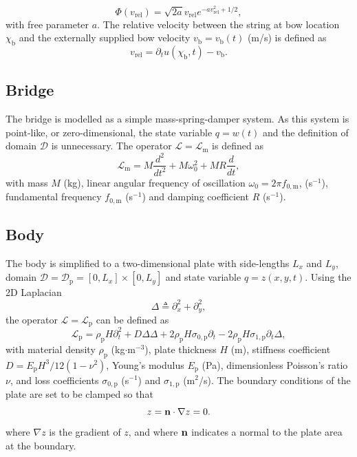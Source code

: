 \documentclass[dvipsnames, pdftex]{article}
\def\stringx{\chi}
\def\us{u}
\def\up{z}
\begin{document}
\begin{equation}
    \Phi(v_\text{rel}) = \sqrt{2a}v_\text{rel}e^{-av_\text{rel}^2+1/2},
\end{equation}
with free parameter $a$. The relative velocity between the string at bow location $\stringx_\text{b}$ and the externally supplied bow velocity $v_\text{b} = v_\text{b}(t)$ (m/s) is defined as
\begin{equation}
    v_\text{rel} = \partial_t\us(\stringx_\text{b},t) - v_\text{b}.
\end{equation}

\subsection{Bridge}
The bridge is modelled as a simple mass-spring-damper system. As this system is point-like, or zero-dimensional, 
the state variable $q = w(t)$ and the definition of domain $\mathcal{D}$ is unnecessary. The operator $\mathcal{L}=\mathcal{L}_\text{m}$ is defined as
\begin{equation}
    \mathcal{L}_\text{m}=M\frac{d^2}{dt^2}+M\omega_0^2+MR\frac{d}{dt},
\end{equation}
with mass $M$ (kg), linear angular frequency of oscillation $\omega_0=2\pi f_{0,\text{m}}$,  (s$^{-1}$), fundamental frequency $f_{0,\text{m}}$ (s$^{-1}$) and damping coefficient $R$ (s$^{-1}$).

\subsection{Body}
The body is simplified to a two-dimensional plate with side-lengths $L_x$ and $L_y$, domain $\mathcal{D} = \mathcal{D}_\text{p} = [0,L_x] \times [0,L_y]$ and state variable $q = \up(x,y,t)$. Using the 2D Laplacian
\begin{equation}\label{eq:laplacian}
    \Delta \triangleq \partial_x^2+\partial_y^2,
\end{equation}
the operator $\mathcal{L} = \mathcal{L}_\text{p}$ can be defined as \cite{bilbao2009numerical}
\begin{equation}
    \mathcal{L}_\text{p} = \rho_\text{p}H\partial_t^2 + D\Delta\Delta +2\rho_\text{p}H\sigma_{0,\text{p}}\partial_t-2\rho_\text{p}H\sigma_{1,\text{p}}\partial_t\Delta,
\end{equation}
with material density $\rho_\text{p}$ (kg$\cdot$m$^{-3}$), plate thickness $H$ (m), stiffness coefficient $D = E_\text{p}H^3/12(1-\nu^2)$, Young's modulus $E_\text{p}$ (Pa), dimensionless Poisson's ratio $\nu$, and loss coefficients $\sigma_{0,\text{p}}$ (s$^{-1}$) and $\sigma_{1,\text{p}}$ (m$^2$/s). The boundary conditions of the plate are set to be clamped so that
\begin{equation}
    \up = {\bf n} \cdot \nabla \up = 0.
\end{equation}
where $\nabla \up$ is the gradient of $\up$, and where ${\bf n}$ indicates a normal to the plate area at the boundary.
\end{document}
